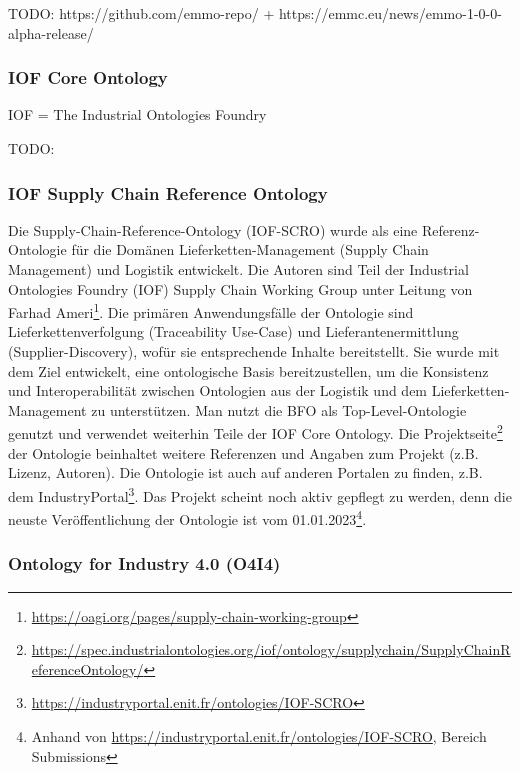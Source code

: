 \documentclass{article}
\begin{document}
TODO: https://github.com/emmo-repo/ + https://emmc.eu/news/emmo-1-0-0-alpha-release/

\subsubsection{IOF Core Ontology}

IOF = The Industrial Ontologies Foundry

TODO: \cite{kulvatunyou2022}

\subsubsection{IOF Supply Chain Reference Ontology}

Die Supply-Chain-Reference-Ontology (IOF-SCRO) wurde als eine Referenz-Ontologie für die Domänen Lieferketten-Management (Supply Chain Management) und Logistik entwickelt\cite{ameri2020towards}.
Die Autoren sind Teil der Industrial Ontologies Foundry (IOF) Supply Chain Working Group unter Leitung von Farhad Ameri\footnote{\url{https://oagi.org/pages/supply-chain-working-group}}.
Die primären Anwendungsfälle der Ontologie sind Lieferkettenverfolgung (Traceability Use-Case) und Lieferantenermittlung (Supplier-Discovery), wofür sie entsprechende Inhalte bereitstellt.
Sie wurde mit dem Ziel entwickelt, eine ontologische Basis bereitzustellen, um die Konsistenz und Interoperabilität zwischen Ontologien aus der Logistik und dem Lieferketten-Management zu unterstützen.
Man nutzt die BFO als Top-Level-Ontologie genutzt und verwendet weiterhin Teile der IOF Core Ontology\cite{Kulvatunyou2022}.
Die Projektseite\footnote{\url{https://spec.industrialontologies.org/iof/ontology/supplychain/SupplyChainReferenceOntology/}} der Ontologie beinhaltet weitere Referenzen und Angaben zum Projekt (z.B. Lizenz, Autoren).
Die Ontologie ist auch auf anderen Portalen zu finden, z.B. dem IndustryPortal\footnote{\url{https://industryportal.enit.fr/ontologies/IOF-SCRO}}.
Das Projekt scheint noch aktiv gepflegt zu werden, denn die neuste Veröffentlichung der Ontologie ist vom 01.01.2023\footnote{Anhand von \url{https://industryportal.enit.fr/ontologies/IOF-SCRO}, Bereich Submissions}.

\subsubsection{Ontology for Industry 4.0 (O4I4)}

\cite{kumar2019ontologies}
\end{document}
